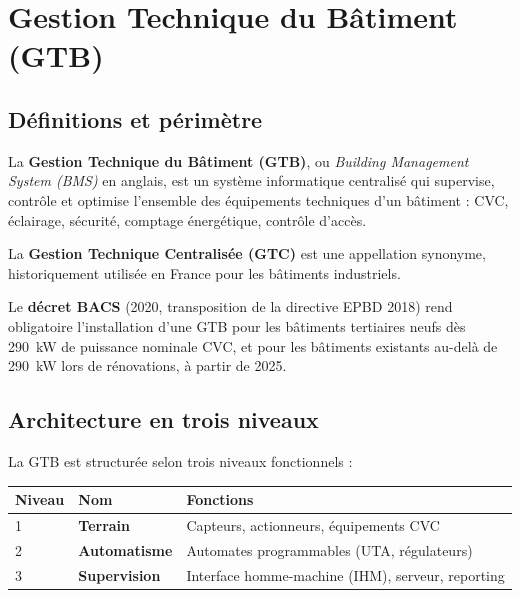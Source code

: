 \section{Gestion Technique du Bâtiment (GTB)}

\subsection{Définitions et périmètre}

\begin{definition}
  La \textbf{Gestion Technique du Bâtiment (GTB)}, ou \textit{Building Management System (BMS)} en anglais, est un système informatique centralisé qui supervise, contrôle et optimise l'ensemble des équipements techniques d'un bâtiment : CVC, éclairage, sécurité, comptage énergétique, contrôle d'accès.

  La \textbf{Gestion Technique Centralisée (GTC)} est une appellation synonyme, historiquement utilisée en France pour les bâtiments industriels.
\end{definition}

Le \textbf{décret BACS} (2020, transposition de la directive EPBD 2018) rend obligatoire l'installation d'une GTB pour les bâtiments tertiaires neufs dès \SI{290}{\kilo\watt} de puissance nominale CVC, et pour les bâtiments existants au-delà de \SI{290}{\kilo\watt} lors de rénovations, à partir de 2025.

\subsection{Architecture en trois niveaux}

La GTB est structurée selon trois niveaux fonctionnels :

\begin{center}
\begin{tabular}{lll}
  \toprule
  Niveau & Nom & Fonctions \\
  \midrule
  1 & \textbf{Terrain} & Capteurs, actionneurs, équipements CVC \\
  2 & \textbf{Automatisme} & Automates programmables (UTA, régulateurs) \\
  3 & \textbf{Supervision} & Interface homme-machine (IHM), serveur, reporting \\
  \bottomrule
\end{tabular}
\end{center}

